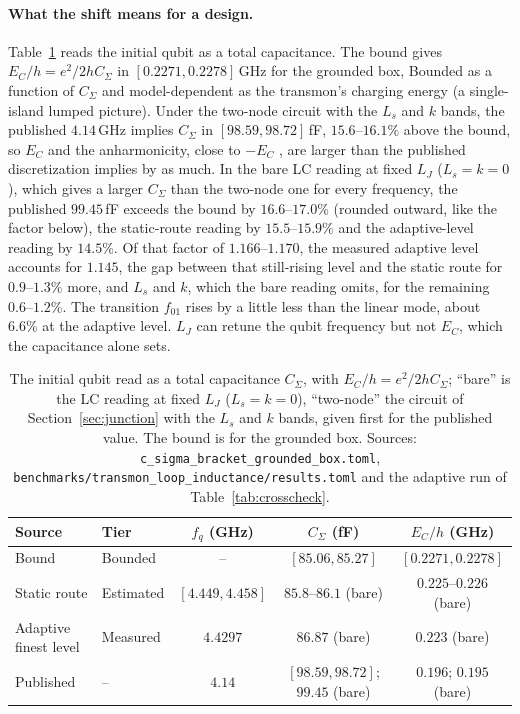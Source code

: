 \documentclass{anvil-paper}
\begin{document}
\paragraph{What the shift means for a design.}
Table~\ref{tab:design} reads the initial qubit as a total capacitance. The
bound gives $E_C/h = e^2/2hC_\Sigma$ in $[0.2271, 0.2278]$\,GHz for the
grounded box, Bounded as a function of $C_\Sigma$ and model-dependent as
the transmon's charging energy (a single-island lumped picture). Under the
two-node circuit with the $L_s$ and $k$ bands, the published $4.14$\,GHz
implies $C_\Sigma$ in $[98.59, 98.72]$\,fF, $15.6$--$16.1\%$ above the
bound, so $E_C$ and the anharmonicity, close to $-E_C$
\citep{koch2007charge}, are larger than the published discretization
implies by as much. In the bare LC reading at fixed $L_J$ ($L_s = k = 0$),
which gives a larger $C_\Sigma$ than the two-node one for every frequency,
the published $99.45$\,fF exceeds the bound by $16.6$--$17.0\%$ (rounded outward, like the
factor below), the
static-route reading by $15.5$--$15.9\%$ and the adaptive-level reading by
$14.5\%$. Of that factor of $1.166$--$1.170$, the measured adaptive level
accounts for $1.145$, the gap between that still-rising level and the
static route for $0.9$--$1.3\%$ more, and $L_s$ and $k$, which the bare
reading omits, for the remaining $0.6$--$1.2\%$. The transition $f_{01}$
rises by a little less than the linear mode, about $6.6\%$ at the adaptive
level. $L_J$ can retune the qubit frequency but not $E_C$, which the
capacitance alone sets.

\begin{table}[htbp]
  \centering
  \caption{The initial qubit read as a total capacitance $C_\Sigma$, with
  $E_C/h = e^2/2hC_\Sigma$; ``bare'' is the LC reading at fixed $L_J$
  ($L_s = k = 0$), ``two-node'' the circuit of
  Section~\ref{sec:junction} with the $L_s$ and $k$ bands, given first for
  the published value. The bound is for
  the grounded box. Sources: \texttt{c\_sigma\_bracket\_grounded\_box.toml},
  \texttt{benchmarks/transmon\_loop\_inductance/results.toml} and the
  adaptive run of Table~\ref{tab:crosscheck}.}
  \label{tab:design}
  \footnotesize
  \begin{tabular}{@{}llccc@{}}
    \toprule
    Source & Tier & $f_q$ (GHz) & $C_\Sigma$ (fF) & $E_C/h$ (GHz) \\
    \midrule
    Bound & Bounded & -- & $[85.06, 85.27]$ & $[0.2271, 0.2278]$ \\
    Static route & Estimated & $[4.449, 4.458]$ & $85.8$--$86.1$ (bare) & $0.225$--$0.226$ (bare) \\
    Adaptive finest level & Measured & $4.4297$ & $86.87$ (bare) & $0.223$ (bare) \\
    Published & -- & $4.14$ & $[98.59, 98.72]$; $99.45$ (bare) & $0.196$; $0.195$ (bare) \\
    \bottomrule
  \end{tabular}
\end{table}
\end{document}
